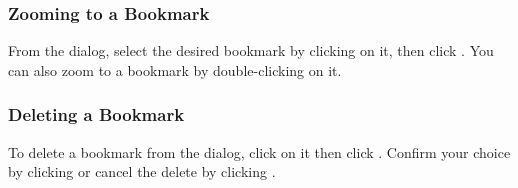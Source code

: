 \subsubsection{Zooming to a Bookmark}
From the  dialog, select the desired bookmark by clicking on it, 
then click .
You can also zoom to a bookmark by double-clicking on it.

\subsubsection{Deleting a Bookmark}
To delete a bookmark from the  dialog, click on it then click
 .
Confirm your choice by clicking  or cancel the delete by clicking .
